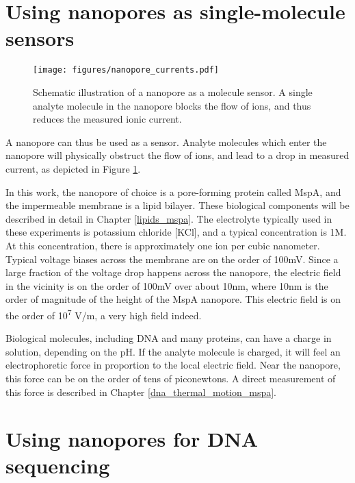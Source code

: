 \section{Using nanopores as single-molecule sensors}

\begin{figure}[h]
\begin{centering}
\texttt{[image: figures/nanopore\_currents.pdf]}
\caption[The nanopore as a molecule sensor]{Schematic illustration of a nanopore as a molecule sensor.  A single analyte molecule in the nanopore blocks the flow of ions, and thus reduces the measured ionic current.}
\label{fig:nanopore_current_blockage}
\end{centering}
\end{figure}

A nanopore can thus be used as a sensor.  Analyte molecules which enter the nanopore will physically obstruct the flow of ions, and lead to a drop in measured current, as depicted in Figure \ref{fig:nanopore_current_blockage}.

In this work, the nanopore of choice is a pore-forming protein called MspA, and the impermeable membrane is a lipid bilayer.  These biological components will be described in detail in Chapter \ref{lipids_mspa}.  The electrolyte typically used in these experiments is potassium chloride [KCl], and a typical concentration is 1M.  At this concentration, there is approximately one ion per cubic nanometer.  Typical voltage biases across the membrane are on the order of 100mV.  Since a large fraction of the voltage drop happens across the nanopore, the electric field in the vicinity is on the order of 100mV over about 10nm, where 10nm is the order of magnitude of the height of the MspA nanopore.  This electric field is on the order of 10\textsuperscript{7} V/m, a very high field indeed.

Biological molecules, including DNA and many proteins, can have a charge in solution, depending on the pH.  If the analyte molecule is charged, it will feel an electrophoretic force in proportion to the local electric field.  Near the nanopore, this force can be on the order of tens of piconewtons.  A direct measurement of this force is described in Chapter \ref{dna_thermal_motion_mspa}.

\section{Using nanopores for DNA sequencing}

